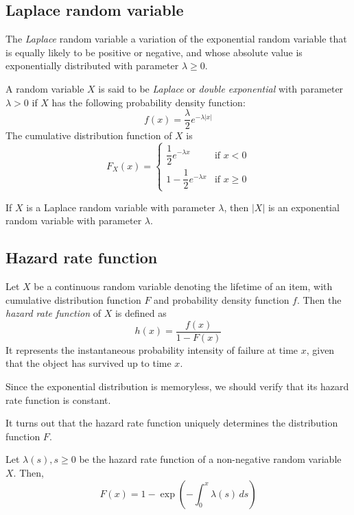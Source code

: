 \documentclass{article}
\begin{document}
\subsection{Laplace random variable}

The \emph{Laplace} random variable a variation of the exponential random variable that is equally likely to be positive or negative, and whose absolute value is exponentially distributed with parameter $\lambda \geq 0$.

\begin{definition}
  A random variable $X$ is said to be \emph{Laplace} or \emph{double exponential} with parameter $\lambda > 0$ if $X$ has the following probability density function:
  \[
    f(x) = \dfrac{\lambda}{2} e^{-\lambda |x|}
  \]
  The cumulative distribution function of $X$ is
  \[
    F_X(x) = \begin{cases}
      \dfrac{1}{2} e^{-\lambda x}     & \text{if } x < 0    \\
      1 - \dfrac{1}{2} e^{-\lambda x} & \text{if } x \geq 0
    \end{cases}
  \]
\end{definition}

\begin{remark}
  If $X$ is a Laplace random variable with parameter $\lambda$, then $|X|$ is an exponential random variable with parameter $\lambda$.
\end{remark}

\subsection{Hazard rate function}

\begin{definition}
  Let $X$ be a continuous random variable denoting the lifetime of an item, with cumulative distribution function $F$ and probability density function $f$.
  Then the \emph{hazard rate function} of $X$ is defined as
  \[
    h(x) = \frac{f(x)}{1 - F(x)}
  \]
  It represents the instantaneous probability intensity of failure at time $x$, given that the object has survived up to time $x$.
\end{definition}
Since the exponential distribution is memoryless, we should verify that its hazard rate function is constant.

It turns out that the hazard rate function uniquely determines the distribution function $F$.
\begin{remark}
  Let $\lambda(s), s \geq 0$ be the hazard rate function of a non-negative random variable $X$.
  Then,
  \[
    F(x) = 1 - \exp\left(-\int_0^x \lambda(s) \, ds\right)
  \]
\end{remark}
\end{document}
